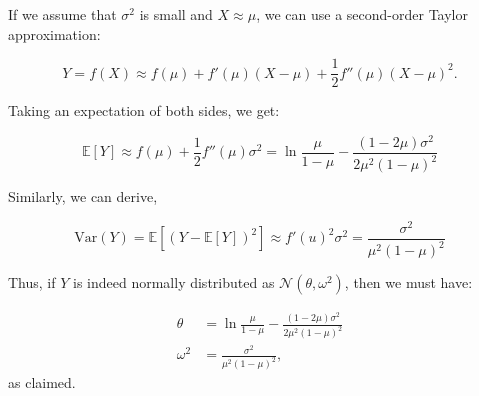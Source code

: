 \documentclass[tikz]{article}
\begin{document}
If we assume that $\sigma^2$ is small and $X \approx \mu$, we can use a second-order Taylor approximation:

$$Y = f(X) \approx f(\mu) + f'(\mu)(X-\mu) + \frac{1}{2}f''(\mu)(X-\mu)^2.$$

Taking an expectation of both sides, we get:

$$
\mathbb{E}[Y] \approx f(\mu) + \frac{1}{2} f''(\mu)\sigma^2 = \ln{\frac{\mu}{1-\mu}} - \frac{(1-2\mu)\sigma^2}{2\mu^2(1-\mu)^2}
$$

Similarly, we can derive,

$$
\mathrm{Var}(Y) = \mathbb{E}[(Y - \mathbb{E}[Y])^2] \approx f'(u)^2\sigma^2 = \frac{\sigma^2}{\mu^2(1-\mu)^2}
$$

Thus, if $Y$ is indeed normally distributed as $\mathcal{N}(\theta, \omega^2)$, then we must have:

\begin{align*}
\theta &= \ln{\frac{\mu}{1-\mu}} - \frac{(1-2\mu)\sigma^2}{2\mu^2(1-\mu)^2} \\
\omega^2 &= \frac{\sigma^2}{\mu^2(1-\mu)^2},
\end{align*}
as claimed.
\end{document}
